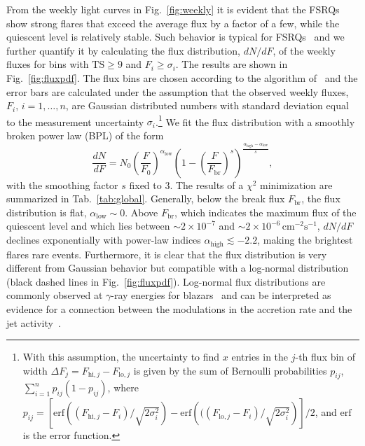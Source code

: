 \documentclass[twocolumn,linenumbers]{aastex62}
\newcommand{\gray}{$\gamma$-ray\xspace}
\begin{document}
From the weekly light curves in Fig.~\ref{fig:weekly} it is evident that the FSRQs show strong flares that exceed the average flux by a factor of a few, while the quiescent level is relatively stable. 
Such behavior is typical for FSRQs~\citet{} and we 
further quantify it by calculating the flux distribution, $dN/dF$, of the weekly fluxes for bins with $\mathrm{TS} \geqslant 9$ and $F_i \geqslant \sigma_i$. 
The results are shown in Fig.~\ref{fig:fluxpdf}. The flux bins are chosen according to the algorithm of~\citet{knuth2006} and the error bars are calculated under the assumption that the observed weekly fluxes, $F_i$, $i = 1,\ldots,n$, are Gaussian distributed numbers with standard deviation equal to the measurement uncertainty $\sigma_i$.\footnote{
With this assumption, the uncertainty to find $x$ entries in the $j$-th flux bin of width $\Delta F_j = F_{\mathrm{hi},j} - F_{\mathrm{lo},j}$ is given by the sum of Bernoulli probabilities $p_{ij}$, $\sum_{i = 1}^n p_{ij}(1-p_{ij})$, where $p_{ij} =  \left[\mathrm{erf}\left((F_{\mathrm{hi},j} - F_i) / \sqrt{2\sigma_i^2}\right) - \mathrm{erf}\left(((F_{\mathrm{lo},j} - F_i) / \sqrt{2\sigma_i^2}\right)\right]/2$, and $\mathrm{erf}$ is the error function.
}
We fit the flux distribution with a smoothly broken power law (BPL) of the form 
\begin{equation}
    \frac{dN}{dF} = N_0 \left( \frac{F}{F_0}\right)^{\alpha_\mathrm{low}}
        \left( 1 - \left(\frac{F}{F_\mathrm{br}}\right)^s \right)^{\frac{\alpha_\mathrm{high} - \alpha_\mathrm{low}}{s}},
        \label{eq:dndf}
\end{equation}
with the smoothing factor $s$ fixed to 3. 
The results of a $\chi^2$ minimization are summarized in Tab.~\ref{tab:global}.
Generally, below the break flux $F_\mathrm{br}$, the flux distribution is flat, $\alpha_\mathrm{low}\sim 0$.
Above $F_\mathrm{br}$, which indicates the maximum flux of the quiescent level and which lies between $\sim2\times10^{-7}$ and $\sim2\times10^{-6}\,\mathrm{cm}^{-2}\mathrm{s}^{-1}$, $dN/dF$ declines exponentially with power-law indices $\alpha_\mathrm{high} \lesssim -2.2$, making the brightest flares rare events.
Furthermore, it is clear that the flux distribution is very different from Gaussian behavior but
compatible with a log-normal distribution (black dashed lines in Fig.~\ref{fig:fluxpdf}). 
Log-normal flux distributions are commonly observed at \gray energies for blazars~\citep[e.g.,][]{2010A&A...524A..48T,2015ApJ...810...14A,2018arXiv180504675S}
and can be interpreted as evidence for a connection between the  
modulations in the accretion rate and the jet activity~\citep{2009A&A...503..797G}.
\end{document}
